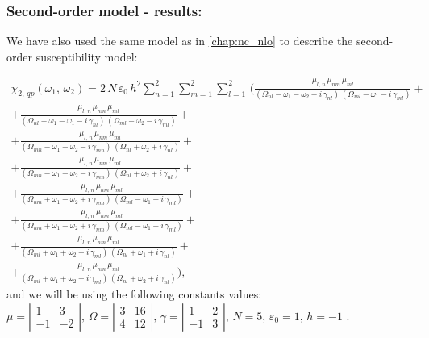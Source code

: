 \documentclass[12pt,twoside,a4paper]{article}
\numberwithin{equation}{subsection}
\numberwithin{figure}{subsection}
\begin{document}
\subsubsection*{Second-order model - results:}

We have also used the same model as in \ref{chap:nc_nlo} to describe the second-order susceptibility model:

\begin{multline} \label{eq:four_qp2}
  \chi_{2, \,qp}({\omega_{1}}, \,{\omega_{2}}) = 
   2\,N\,\varepsilon_{0}\,h^{2}\sum_{n=1}^{2}\sum_{m=1}^{2}\sum_{l=1}^{2}\,
  (      \frac {{\mu_{l,\,n}}\,{\mu_{nm}}\,{\mu_{ml}}}
      {({\Omega_{nl}} - \omega_1 - \omega_2 - i\,{\gamma_{nl}})\,({\Omega_{ml}} - \omega_1 - i\,{\gamma_{ml}})} 
  + \\ + \frac {{\mu_{l, \,n}}\,{\mu_{nm}}\,{\mu_{ml}}}
      {({\Omega_{nl}} - \omega_1 - \omega_1 - i\,{\gamma_{nl}})\,({\Omega_{ml}} - \omega_2 - i\,{\gamma_{ml}})}
  + \\ + \frac {{\mu_{l, \,n}}\,{\mu_{nm}}\,{\mu_{ml}}}
      {({\Omega_{mn}} - \omega_1 - \omega_2 - i\,{\gamma_{mn}})\,({\Omega_{nl}} + \omega_2 + i\,{\gamma_{nl}})}
  + \\ + \frac{{\mu_{l, \,n }}\,{\mu_{nm}}\,{\mu_{ml}}} 
      {({\Omega_{mn}} - \omega_1 - \omega_2 - i\,{\gamma_{mn}})\,({\Omega_{nl}} + \omega_2 + i\,{\gamma_{nl}})} 
  + \\ + \frac {{\mu_{l, \,n}}\,{\mu_{nm}}\,{\mu_{ml}}}
      {({\Omega_{nm}} + \omega_1 + \omega_2 + i\,{\gamma_{nm}})\,({\Omega_{ml}} - \omega_1 - i\,{\gamma_{ml}})}
  + \\ + \frac {{\mu_{l, \,n}}\,{\mu_{ nm}}\,{\mu_{ml}}}
      {({\Omega_{nm}} + \omega_1 + \omega_2 + i\,{\gamma_{nm}})\,({\Omega_{ml}} - \omega_1 - i\,{\gamma_{ml}})} 
  + \\ + \frac {{\mu_{l, \,n}}\,{\mu_{nm}}\,{\mu_{ml}}}
      {({\Omega_{ml}} + \omega_1 + \omega_2 + i\,{\gamma_{ml}})\,({\Omega_{nl}} + \omega_1 + i\,{\gamma_{nl}})}
  + \\ + \frac {{\mu_{l, \,n}}\,{\mu_{nm}}\,{\mu_{ml}}}
      {({\Omega_{ml}} + \omega_1 + \omega_2 + i\,{\gamma_{ml}})\,({\Omega_{nl}} + \omega_2 + i\,{\gamma_{nl}})}
  ) ,
\end{multline}
and we will be using the following constants values:
$\mu = \left| \begin{array}{cc} 
    1 & 3 \\ -1 & -2 
  \end{array} \right|,\, 
  \Omega = \left| \begin{array}{cc} 
    3 & 16 \\ 4 & 12 
  \end{array} \right|,\,
  \gamma = \left| \begin{array}{cc} 
  1 & 2 \\ -1 & 3
  \end{array} \right|,\, N=5,\, {\varepsilon_{0}}=1,\,h= - 1$ .
\end{document}
